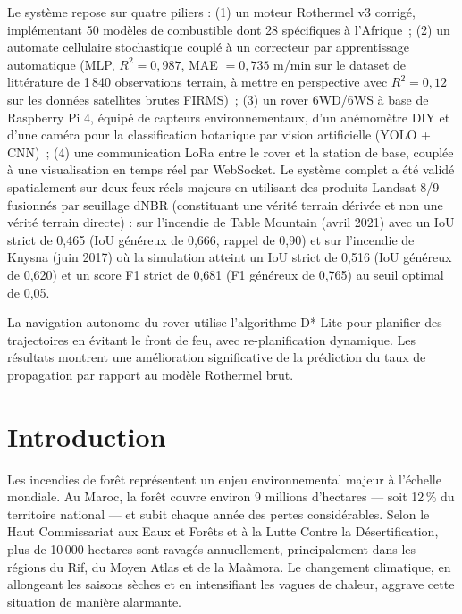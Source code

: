 \documentclass[a4paper,12pt,openany,titlepage]{scrartcl}
\begin{document}
Le système repose sur quatre piliers : (1) un moteur Rothermel v3 corrigé, implémentant 50 modèles de combustible dont 28 spécifiques à l'Afrique~; (2) un automate cellulaire stochastique couplé à un correcteur par apprentissage automatique (MLP, $R^2 = 0{,}987$, MAE $= 0{,}735$ m/min sur le dataset de littérature de 1\,840 observations terrain, à mettre en perspective avec $R^2 = 0{,}12$ sur les données satellites brutes FIRMS)~; (3) un rover 6WD/6WS à base de Raspberry Pi 4, équipé de capteurs environnementaux, d'un anémomètre DIY et d'une caméra pour la classification botanique par vision artificielle (YOLO + CNN)~; (4) une communication LoRa entre le rover et la station de base, couplée à une visualisation en temps réel par WebSocket. Le système complet a été validé spatialement sur deux feux réels majeurs en utilisant des produits Landsat 8/9 fusionnés par seuillage dNBR (constituant une vérité terrain dérivée et non une vérité terrain directe) : sur l'incendie de Table Mountain (avril 2021) avec un IoU strict de 0,465 (IoU généreux de 0,666, rappel de 0,90) et sur l'incendie de Knysna (juin 2017) où la simulation atteint un IoU strict de 0,516 (IoU généreux de 0,620) et un score F1 strict de 0,681 (F1 généreux de 0,765) au seuil optimal de 0,05.

La navigation autonome du rover utilise l'algorithme D* Lite pour planifier des trajectoires en évitant le front de feu, avec re-planification dynamique. Les résultats montrent une amélioration significative de la prédiction du taux de propagation par rapport au modèle Rothermel brut.

\newpage
\pagestyle{scrheadings}

\section{Introduction}

Les incendies de forêt représentent un enjeu environnemental majeur à l'échelle mondiale. Au Maroc, la forêt couvre environ 9 millions d'hectares --- soit 12\,\% du territoire national --- et subit chaque année des pertes considérables. Selon le Haut Commissariat aux Eaux et Forêts et à la Lutte Contre la Désertification, plus de 10\,000 hectares sont ravagés annuellement, principalement dans les régions du Rif, du Moyen Atlas et de la Maâmora. Le changement climatique, en allongeant les saisons sèches et en intensifiant les vagues de chaleur, aggrave cette situation de manière alarmante.
\end{document}
